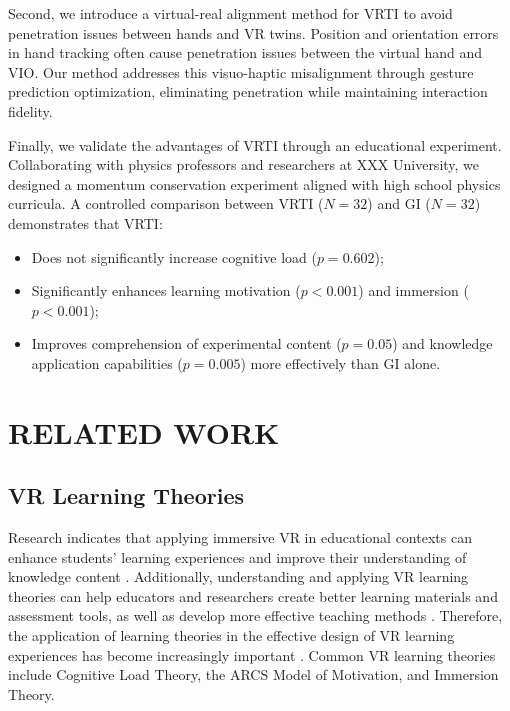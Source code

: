 \documentclass[sigconf,review,anonymous]{acmart}
\begin{document}
Second, we introduce a virtual-real alignment method for VRTI to avoid penetration issues between hands and VR twins. Position and orientation errors in hand tracking often cause penetration issues between the virtual hand and VIO. Our method addresses this visuo-haptic misalignment through gesture prediction optimization, eliminating penetration while maintaining interaction fidelity.

Finally, we validate the advantages of VRTI through an educational experiment. Collaborating with physics professors and researchers at XXX
University, we designed a momentum conservation experiment aligned with high school physics curricula. A controlled comparison between VRTI ($N=32$) and GI ($N=32$) demonstrates that VRTI:

\begin{itemize}
  \item Does not significantly increase cognitive load ($p = 0.602$);

  \item Significantly enhances learning motivation ($p < 0.001$) and immersion ($p < 0.001$);

  \item Improves comprehension of experimental content ($p = 0.05$) and knowledge application capabilities ($p = 0.005$) more effectively than GI alone.
\end{itemize}

\section{RELATED WORK}
\subsection{VR Learning Theories}
Research indicates that applying immersive VR in educational contexts can enhance students' learning experiences and improve their understanding of knowledge content \cite{freina2015literature}. Additionally, understanding and applying VR learning theories can help educators and researchers create better learning materials and assessment tools, as well as develop more effective teaching methods \cite{matovu2023immersive}. Therefore, the application of learning theories in the effective design of VR learning experiences has become increasingly important \cite{marougkas2023virtual}. Common VR learning theories include Cognitive Load Theory, the ARCS Model of Motivation, and Immersion Theory.
\end{document}
